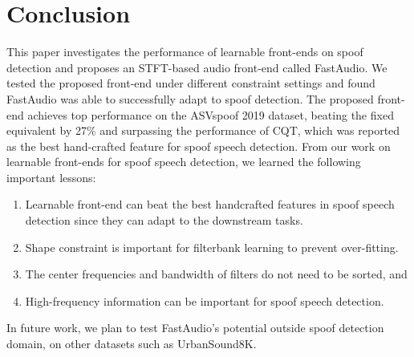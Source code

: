 \documentclass[conference]{IEEEtran}
\begin{document}
\section{Conclusion}
\label{conclusionfuturework.section}

This paper investigates the performance of learnable front-ends on spoof detection and proposes an STFT-based audio front-end called FastAudio. We tested the proposed front-end under different constraint settings and found FastAudio was able to successfully adapt to spoof detection. The proposed front-end achieves top performance on the ASVspoof 2019 dataset, beating the fixed equivalent by 27\% and surpassing the performance of CQT, which was reported as the best hand-crafted feature for spoof speech detection. From our work on learnable front-ends for spoof speech detection, we learned the following important lessons:

\begin{enumerate}
    \item Learnable front-end can beat the best handcrafted features in spoof speech detection since they can adapt to the downstream tasks.
    \item Shape constraint is important for filterbank learning to prevent over-fitting.
    \item The center frequencies and bandwidth of filters do not need to be sorted, and
    \item High-frequency information can be important for spoof speech detection.
\end{enumerate}

In future work, we plan to test FastAudio's potential outside spoof detection domain, on other datasets such as UrbanSound8K.



\end{document}
